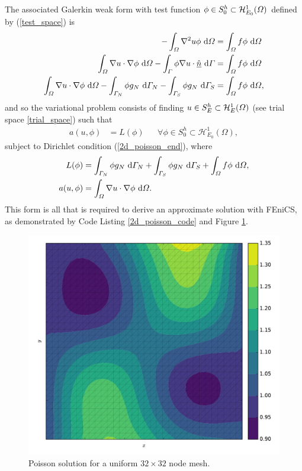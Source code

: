 The associated Galerkin weak form with test function $\phi \in S_0^h \subset \mathcal{H}_{E_0}^1(\varOmega)$ defined by (\ref{test_space}) is
\begin{align*}
  -\int_{\varOmega} \nabla^2 u \phi \ \mathrm{d}\varOmega &= \int_{\varOmega} f \phi \ \mathrm{d}\varOmega \\
  \int_{\varOmega} \nabla u \cdot \nabla \phi \ \mathrm{d}\varOmega - \int_{\varGamma} \phi \nabla u \cdot \underline{\hat{n}} \ \mathrm{d}\varGamma &= \int_{\varOmega} f \phi \ \mathrm{d}\varOmega \\
  \int_{\varOmega} \nabla u \cdot \nabla \phi \ \mathrm{d}\varOmega - \int_{\varGamma_N} \phi g_N \ \mathrm{d}\varGamma_N - \int_{\varGamma_S} \phi g_N \ \mathrm{d}\varGamma_S &= \int_{\varOmega} f \phi \ \mathrm{d}\varOmega,
\end{align*}
and so the variational problem consists of finding $u \in S_E^h \subset \mathcal{H}_E^1(\varOmega)$ (see trial space \ref{trial_space}) such that
\begin{align*}
  a(u,\phi) &= L(\phi) && \forall \phi \in S_0^h \subset \mathcal{H}_{E_0}^1(\Omega),
\end{align*}
subject to Dirichlet condition (\ref{2d_poisson_end}), where
\begin{align*}
  L(\phi) &= \int_{\varGamma_N} \phi g_N \ \mathrm{d}\varGamma_N + \int_{\varGamma_S} \phi g_N \ \mathrm{d}\varGamma_S + \int_{\varOmega} f \phi \ \mathrm{d}\varOmega, \\
  a(u,\phi) &= \int_{\varOmega} \nabla u \cdot \nabla \phi \ \mathrm{d}\varOmega.
\end{align*}
This form is all that is required to derive an approximate solution with FEniCS, as demonstrated by Code Listing \ref{2d_poisson_code} and Figure \ref{2d_poisson_image}.


\begin{figure}
  \centering
    \includegraphics[width=\linewidth]{images/fenics_intro/2Dpoisson.pdf}
  \caption[Two-dimension Poisson example]{Poisson solution for a uniform $32 \times 32$ node mesh.}
  \label{2d_poisson_image}
\end{figure}

